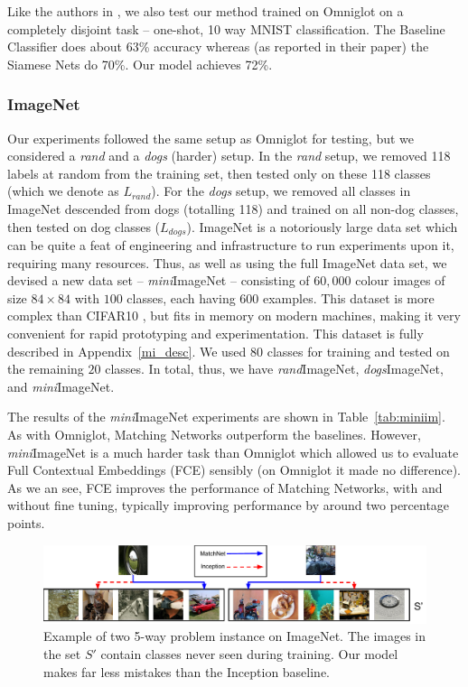 Like the authors in \cite{siamese}, we also test our method trained on Omniglot on a completely disjoint task -- one-shot, 10 way MNIST classification. The Baseline Classifier does about 63\% accuracy whereas (as reported in their paper) the Siamese Nets do 70\%. Our model achieves 72\%.

\subsubsection{ImageNet}
\label{sec:imagenet}

Our experiments followed the same setup as Omniglot for testing, but we considered a \emph{rand} and a \emph{dogs} (harder) setup. In the \emph{rand} setup, we removed 118 labels at random from the training set, then tested only on these 118 classes (which we denote as $L_{rand}$). For the \emph{dogs} setup, we removed all classes in ImageNet descended from dogs (totalling 118) and trained on all non-dog classes, then tested on dog classes ($L_{dogs}$).
ImageNet is a notoriously large data set which can be quite a feat of engineering and infrastructure to run experiments upon it, requiring many resources.
Thus, as well as using the full ImageNet data set, we devised a new data set -- \emph{mini}ImageNet -- consisting of $60,000$ colour images of size $84\times 84$ with $100$ classes, each having $600$ examples. This dataset is more complex than CIFAR10 \cite{krizhevsky2010convolutional}, but fits in memory on modern machines, making it very convenient for rapid prototyping and experimentation. This dataset is fully described in Appendix~\ref{mi_desc}.
We used $80$ classes for training and tested on the remaining $20$ classes.
In total, thus, we have \emph{rand}ImageNet, \emph{dogs}ImageNet, and \emph{mini}ImageNet.

The results of the \emph{mini}ImageNet experiments are shown in Table~\ref{tab:miniim}. As with Omniglot, Matching Networks outperform the baselines.
However, \emph{mini}ImageNet is a much harder task than Omniglot which allowed us to evaluate Full Contextual Embeddings (FCE) sensibly (on Omniglot it made no difference).
As we an see, FCE improves the performance of Matching Networks, with and without fine tuning, typically improving performance by around two percentage points. 

\begin{figure}[t]
\centering
\includegraphics[width=1.0\textwidth]{figure_images}
\caption{\label{fig:imgs}Example of two 5-way problem instance on ImageNet. The images in the set $S'$ contain classes never seen during training. Our model makes far less mistakes than the Inception baseline. }
\end{figure}

